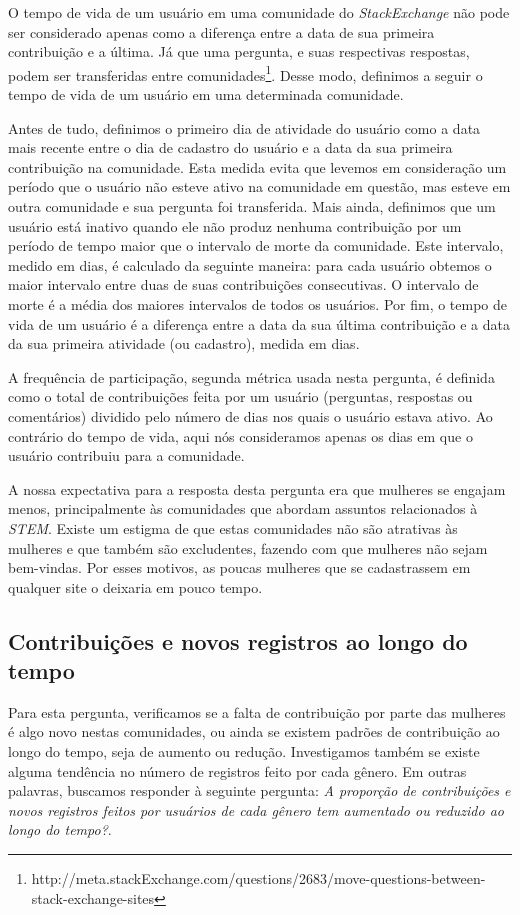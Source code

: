 O tempo de vida de um usuário em uma comunidade do \emph{StackExchange} não pode ser considerado apenas como a diferença entre a data de sua primeira contribuição e a última. Já que uma pergunta, e suas respectivas respostas, podem ser transferidas entre comunidades\footnote{http://meta.stackExchange.com/questions/2683/move-questions-between-stack-exchange-sites}. Desse modo, definimos a seguir o tempo de vida de um usuário em uma determinada comunidade. 

Antes de tudo, definimos o primeiro dia de atividade do usuário como a data mais recente entre o dia de cadastro do usuário e a data da sua primeira contribuição na comunidade. Esta medida evita que levemos em consideração um período que o usuário não esteve ativo na comunidade em questão, mas esteve em outra comunidade e sua pergunta foi transferida. Mais ainda, definimos que um usuário está inativo quando ele não produz nenhuma contribuição por um período de tempo maior que o intervalo de morte da comunidade. Este intervalo, medido em dias, é calculado da seguinte maneira: para cada usuário obtemos o maior intervalo entre duas de suas contribuições consecutivas. O intervalo de morte é a média dos maiores intervalos de todos os usuários. Por fim, o tempo de vida de um usuário é a diferença entre a data da sua última contribuição e a data da sua primeira atividade (ou cadastro), medida em dias.

A frequência de participação, segunda métrica usada nesta pergunta, é definida como o total de contribuições feita por um usuário (perguntas, respostas ou comentários) dividido pelo número de dias nos quais o usuário estava ativo. Ao contrário do tempo de vida, aqui nós consideramos apenas os dias em que o usuário contribuiu para a comunidade.

A nossa expectativa para a resposta desta pergunta era que mulheres se engajam menos, principalmente às comunidades que abordam assuntos relacionados à \emph{STEM}. Existe um estigma de que estas comunidades não são atrativas às mulheres e que também são excludentes, fazendo com que mulheres não sejam bem-vindas. Por esses motivos, as poucas mulheres que se cadastrassem em qualquer site o deixaria em pouco tempo.

\subsection{Contribuições e novos registros ao longo do tempo}

Para esta pergunta, verificamos se a falta de contribuição por parte das mulheres é algo novo nestas comunidades, ou ainda se existem padrões de contribuição ao longo do tempo, seja de aumento ou redução. Investigamos também se existe alguma tendência no número de registros feito por cada gênero. Em outras palavras, buscamos responder à seguinte pergunta: \textit{A proporção de contribuições e novos registros feitos por usuários de cada gênero tem aumentado ou reduzido ao longo do tempo?}. 

